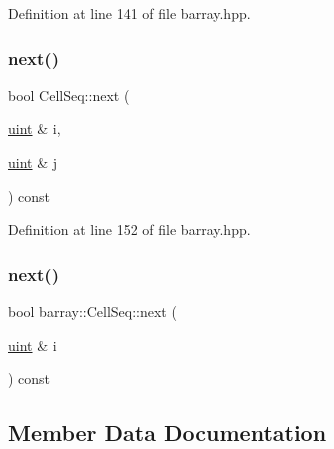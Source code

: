 Definition at line 141 of file barray.\+hpp.

\mbox{\label{classbarray_1_1_cell_seq_a05687b1000bcce13c0f81c0203363ce7}} 
\subsubsection{\texorpdfstring{next()}{next()}\hspace{0.1cm}{\footnotesize\ttfamily [1/2]}}
{\footnotesize\ttfamily bool Cell\+Seq\+::next (\begin{DoxyParamCaption}\item[{\hyperlink{namespacebarray_af9756a31953db233f80a9cfe1ef31c32}{uint} \&}]{i,  }\item[{\hyperlink{namespacebarray_af9756a31953db233f80a9cfe1ef31c32}{uint} \&}]{j }\end{DoxyParamCaption}) const\hspace{0.3cm}{\ttfamily [inline]}}



Definition at line 152 of file barray.\+hpp.

\mbox{\label{classbarray_1_1_cell_seq_abae3355ed2481f8e7b82ad2175633c7b}} 
\subsubsection{\texorpdfstring{next()}{next()}\hspace{0.1cm}{\footnotesize\ttfamily [2/2]}}
{\footnotesize\ttfamily bool barray\+::\+Cell\+Seq\+::next (\begin{DoxyParamCaption}\item[{\hyperlink{namespacebarray_af9756a31953db233f80a9cfe1ef31c32}{uint} \&}]{i }\end{DoxyParamCaption}) const}



\subsection{Member Data Documentation}
\mbox{\label{classbarray_1_1_cell_seq_a784f078d11ad20735dd17dba9966e419}} 
